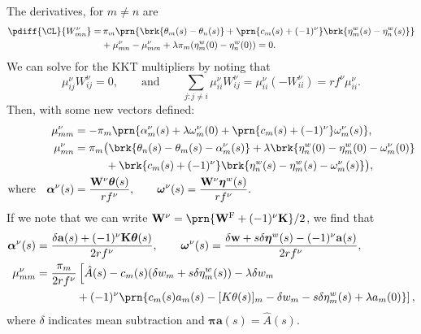 \documentclass[12pt]{article}
\newcommand{\eqm}{\pi}
\newcommand{\eq}{\boldsymbol{\eqm}}
\newcommand{\etwm}{\eta^w}
\newcommand{\etw}{\boldsymbol{\eta}^w}
\newcommand{\thbm}{\theta}
\newcommand{\thb}{\boldsymbol{\thbm}}
\newcommand{\ombm}{\omega}
\newcommand{\omb}{\boldsymbol{\ombm}}
\newcommand{\albm}{\alpha}
\newcommand{\alb}{\boldsymbol{\albm}}
\newcommand{\wm}{w}
\newcommand{\w}{\mathbf{\wm}}
\newcommand{\Wm}{W}
\newcommand{\W}{\mathbf{\Wm}}
\newcommand{\encm}{K}
\newcommand{\enc}{\mathbf{\encm}}
\newcommand{\frg}{\W^{\mathrm{F}}}
\newcommand{\kktm}{\mu}
\begin{document}
The derivatives, for \(m \neq n\) are
%
\begin{equation}\label{eq:finitederivs}
\begin{aligned}
  \pdiff{\CL}{\Wm^\nu_{mn}} = & \,
    \eqm_m \prn{ \brk{\thbm_m(s) - \thbm_n(s)}
     + \prn{c_m(s) + (-1)^\nu} \brk{\etwm_m(s) - \etwm_n(s)} } \\
     &+ \kktm^\nu_{mn} -  \kktm^\nu_{mm}
     + \lambda \eqm_m (\etwm_{m}(0)-\etwm_{n}(0)) 
    = 0.
\end{aligned}
\end{equation}
%
We can solve for the KKT multipliers by noting that
%
\begin{equation*}
  \kktm^\nu_{ij} \Wm^\nu_{ij} = 0,
  \qquad \text{and} \qquad
  \sum_{j: j \neq i} \kktm^\nu_{ii} \Wm^\nu_{ij} 
      = \kktm^\nu_{ii} ( - \Wm^\nu_{ii}) = r f^\nu \kktm^\nu_{ii}.
\end{equation*}
%
Then, with some new vectors defined:
%
\begin{equation}\label{eq:kktsol}
\begin{aligned}
  \kktm^\nu_{mm} &= - \eqm_m \prn{ \albm^\nu_m(s) 
    + \lambda \ombm^\nu_m(0) 
    + \prn{{c}_m(s) + (-1)^\nu} \ombm^\nu_m(s)
    }, \\
  \kktm^\nu_{mn} &= \eqm_m \big( 
      \brk{ \thbm_n(s) - \thbm_m(s) - \albm^\nu_m(s) }
    + \lambda \brk{ \etwm_n(0) - \etwm_m(0) - \ombm^\nu_m(0) } 
  \\ &\hphantom{= \eqm_m \big( }
    + \brk{{c}_m(s) + (-1)^\nu} 
        \brk{ \etwm_n(s) - \etwm_m(s) - \ombm^\nu_m(s) }
     \big), \\
  \text{where} \quad 
  \alb^\nu(s) &= \frac{\W^\nu \thb(s)}{rf^\nu}, \qquad
  \omb^\nu(s) = \frac{\W^\nu \etw(s)}{rf^\nu}.
\end{aligned}
\end{equation}
%
If we note that we can write \( \W^\nu = \prn{\frg + (-1)^\nu \enc} / 2 \), we find that
%
\begin{equation}\label{eq:diagKKT}
\begin{aligned}
  \alb^\nu(s) &= \frac{\delta\mathbf{a}(s) + (-1)^\nu \enc \thb(s)}
                     {2rf^\nu},
  \qquad 
  \omb^\nu(s) = \frac{\delta\w + s \delta\etw(s) - (-1)^\nu \mathbf{a}(s)}
                     {2rf^\nu}, 
  \\
  \kktm^\nu_{mm} &= \frac{\eqm_m}{2rf^\nu} 
    \left[ 
      \hat{A}(s) - c_m(s) (\delta\wm_m + s \delta\etwm_m(s))
      - \lambda \delta w_m
    \right. \\ &\hphantom{= \frac{\eqm_m}{2f^\nu} \big[}
    \left. {}
      + (-1)^\nu \prn{ 
        c_m(s) a_m(s) - [\encm \thbm(s)]_m
        - \delta\wm_m - s \delta\etwm_m(s)
        + \lambda a_m(0)
      }
    \right], 
\end{aligned}
\end{equation}
%
where \(\delta\) indicates mean subtraction and \(\eq \mathbf{a}(s) = \hat{A}(s)\).
\end{document}
